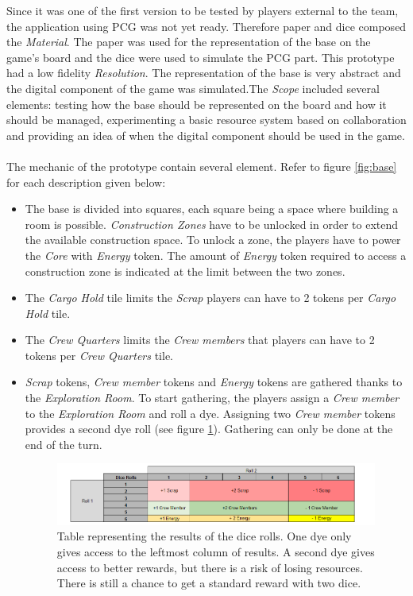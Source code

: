 Since it was one of the first version to be tested by players external to the team, the application using PCG was not yet ready. Therefore paper and dice composed the \textit{Material}. The paper was used for the representation of the base on the game's board and the dice were used to simulate the PCG part. This prototype had a low fidelity \textit{Resolution}. The representation of the base is very abstract and the digital component of the game was simulated.The \textit{Scope} included several elements: testing how the base should be represented on the board and how it should be managed, experimenting a basic resource system based on collaboration and providing an idea of when the digital component should be used in the game. \\\\
The mechanic of the prototype contain several element. Refer to figure \ref{fig:base} for each description given below:
\begin{itemize}
\item The base is divided into squares, each square being a space where building a room is possible. \textit{Construction Zones} have to be unlocked in order to extend the available construction space. To unlock a zone, the players have to power the \textit{Core} with \textit{Energy} token. The amount of \textit{Energy} token required to access a construction zone is indicated at the limit between the two zones.
\item The \textit{Cargo Hold} tile limits the \textit{Scrap} players can have to 2 tokens per \textit{Cargo Hold} tile.
\item The \textit{Crew Quarters} limits the \textit{Crew members} that players can have to 2 tokens per \textit{Crew Quarters} tile.
\item \textit{Scrap} tokens, \textit{Crew member} tokens and \textit{Energy} tokens are gathered thanks to the \textit{Exploration Room}. To start gathering, the players assign a \textit{Crew member} to the \textit{Exploration Room} and roll a dye. Assigning two \textit{Crew member} tokens provides a second dye roll (see figure \ref{fig:Dicetable}). Gathering can only be done at the end of the turn.
\begin{figure}[h]
    \centering
    \includegraphics[scale=0.6]{Images/DiceProto1.png}
    \caption{Table representing the results of the dice rolls. One dye only gives access to the leftmost column of results. A second dye gives access to better rewards, but there is a risk of losing resources. There is still a chance to get a standard reward with two dice.}
    \label{fig:Dicetable}
\end{figure}
\end{itemize}
